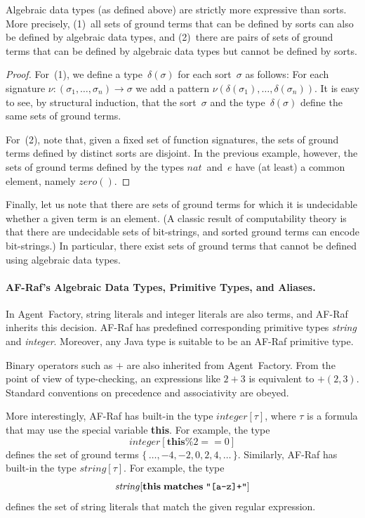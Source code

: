 \documentclass[a4paper,12pt,oneside,fleqn]{book} %
\newcommand{\rg}[1]{\marginpar{\tiny\raggedright\textcolor{blue}{\bf rg:} #1}}
\renewcommand{\rg}{}
\begin{document}
\begin{proposition}
Algebraic data types (as defined above) are strictly more expressive than
sorts. More precisely, (1)~all sets of ground terms that can be defined by
sorts can also be defined by algebraic data types, and (2)~there are pairs
of sets of ground terms that can be defined by algebraic data types but
cannot be defined by sorts.
\end{proposition}

\begin{proof}
For~(1), we define a type~$\delta(\sigma)$ for each sort~$\sigma$ as
follows: For each signature $\nu:(\sigma_1,\ldots,\sigma_n)\to\sigma$ we
add a pattern $\nu(\delta(\sigma_1),\ldots,\delta(\sigma_n))$. It is easy
to see, by structural induction, that the sort~$\sigma$ and the
type~$\delta(\sigma)$ define the same sets of ground terms.

For~(2), note that, given a fixed set of function signatures, the sets of
ground terms defined by distinct sorts are disjoint. In the previous
example, however, the sets of ground terms defined by the types
$\mathit{nat}$~and~$e$ have (at least) a common element, namely
$\mathit{zero}()$.
\end{proof}

Finally, let us note that there are sets of ground terms for which it is
undecidable whether a given term is an element.  (A classic result of
computability theory is that there are undecidable sets of bit-strings, and
sorted ground terms can encode bit-strings.) In particular, there exist
sets of ground terms that cannot be defined using algebraic data types.


\paragraph{AF-Raf's Algebraic Data Types, Primitive Types, and Aliases.}
In Agent~Factory, string literals and integer literals are
also terms, and AF-Raf inherits this decision. AF-Raf has
predefined corresponding primitive types \textit{string} and
\textit{integer}. Moreover, any Java type is suitable to be an AF-Raf
primitive type.

Binary operators such as $+$ are also inherited from Agent~Factory. From
the point of view of type-checking, an expressions like $2+3$ is equivalent
to $+(2,3)$. Standard conventions on precedence and associativity are
obeyed.

More interestingly, AF-Raf has built-in the type $\mathit{integer}[\tau]$,
where $\tau$ is a formula that may use the special variable \textbf{this}.
For example, the type \[\mathit{integer}[\mathbf{this}\%2==0]\] defines the
set of ground terms $\{\,\ldots,-4,-2,0,2,4,\ldots\,\}$. Similarly, AF-Raf
has built-in the type $\mathit{string}[\tau]$. For example, the type
\[\mathit{string}[\mathbf{this}\;\mathbf{matches}\;\verb|"[a-z]+"|]\]
defines the set of string literals that match the given regular expression.
\end{document}
